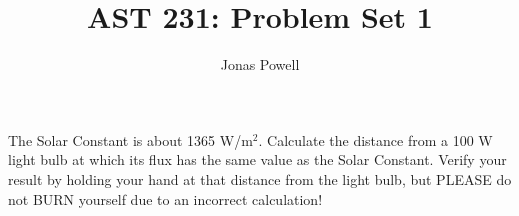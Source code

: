 \documentclass[12pt]{article}
\newenvironment{problem}[2][Problem]{\begin{trivlist}
\item[\hskip \labelsep {\bfseries #1}\hskip \labelsep {\bfseries #2.}]}{\end{trivlist}}
\begin{document}

\title{AST 231: Problem Set 1}
\author{Jonas Powell}
\maketitle

\begin{problem}{1}
The Solar Constant is about 1365 W/m$^2$. Calculate the distance from a 100 W light bulb at which its flux has the same value as the Solar Constant. Verify your result by holding your hand at that distance from the light bulb, but PLEASE do not BURN yourself due to an incorrect calculation!
\end{problem}
\end{document}
